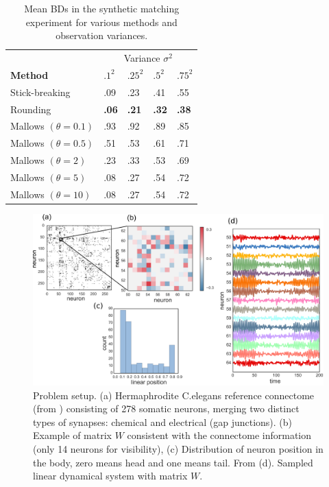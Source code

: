 \documentclass[twoside]{article}
\begin{document}
 \begin{table}[h]
  \caption{Mean BDs in the synthetic matching experiment for various methods and observation variances.}
  \label{table:BDs}
  \centering
  \begin{tabular}{lllll}
    & \multicolumn{4}{c}{Variance $\sigma^2$} \\
    \cmidrule(lr){3-4} 
    \textbf{Method} & $.1^2$ & $.25^2$ & $.5^2$ & $.75^2$ \\
    \hline
    Stick-breaking & .09 & .23 & .41 & .55 \\
    Rounding & \textbf{.06} & \textbf{.21}  & \textbf{.32}  & \textbf{.38} \\
    Mallows $(\theta=0.1)$ & .93 & .92 & .89  & .85 \\
    Mallows $(\theta=0.5)$ & .51 & .53  & .61 & .71 \\
    Mallows $(\theta=2)$ & .23 & .33 & .53  & .69 \\
    Mallows $(\theta=5)$ & .08 & .27 & .54 & .72 \\
    Mallows $(\theta=10)$ & .08 & .27 & .54  & .72 \\
    \bottomrule
  \end{tabular}
\end{table}

\begin{figure}[ht]
  \centering
  \includegraphics[width=6in]{../figures/figure6.pdf} 
  \caption{Problem setup. (a) Hermaphrodite C.elegans reference
    connectome (from \cite{varshney2011structural,wormatlas})
    consisting of 278 somatic neurons, merging two distinct types of
    synapses: chemical and electrical (gap junctions). (b) Example of
    matrix $W$ consistent with the connectome information (only 14
    neurons for visibility), (c) Distribution of neuron position in
    the body, zero means head and one means tail. From
    \cite{white1986structure,wormatlas} (d). Sampled linear dynamical system with matrix $W$.}
  \vspace{-1em}
  \label{fig:connectome}
\end{figure}
\end{document}
